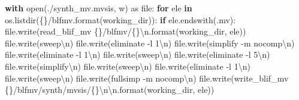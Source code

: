 \documentclass[
  italian,
]{book}
\newenvironment{Shaded}{\begin{snugshade}}{\end{snugshade}}
\newcommand{\BuiltInTok}[1]{#1}
\newcommand{\CharTok}[1]{\textcolor[rgb]{0.31,0.60,0.02}{#1}}
\newcommand{\ControlFlowTok}[1]{\textcolor[rgb]{0.13,0.29,0.53}{\textbf{#1}}}
\newcommand{\ImportTok}[1]{#1}
\newcommand{\KeywordTok}[1]{\textcolor[rgb]{0.13,0.29,0.53}{\textbf{#1}}}
\newcommand{\NormalTok}[1]{#1}
\newcommand{\SpecialCharTok}[1]{\textcolor[rgb]{0.00,0.00,0.00}{#1}}
\newcommand{\StringTok}[1]{\textcolor[rgb]{0.31,0.60,0.02}{#1}}
\begin{document}
\begin{Shaded}
\begin{Highlighting}[]
  \ControlFlowTok{with} \BuiltInTok{open}\NormalTok{(}\StringTok{\textquotesingle{}./synth\_mv.mvsis\textquotesingle{}}\NormalTok{, }\StringTok{\textquotesingle{}w\textquotesingle{}}\NormalTok{) }\ImportTok{as} \BuiltInTok{file}\NormalTok{:}
    \ControlFlowTok{for}\NormalTok{ ele }\KeywordTok{in}\NormalTok{ os.listdir(}\StringTok{\textquotesingle{}}\SpecialCharTok{\{\}}\StringTok{/blfmv\textquotesingle{}}\NormalTok{.}\BuiltInTok{format}\NormalTok{(working\_dir)):}
      \ControlFlowTok{if}\NormalTok{ ele.endswith(}\StringTok{\textquotesingle{}.mv\textquotesingle{}}\NormalTok{):}
        \BuiltInTok{file}\NormalTok{.write(}\StringTok{\textquotesingle{}read\_blif\_mv }\SpecialCharTok{\{\}}\StringTok{/blfmv/}\SpecialCharTok{\{\}}\CharTok{\textbackslash{}n}\StringTok{\textquotesingle{}}\NormalTok{.}\BuiltInTok{format}\NormalTok{(working\_dir, ele))}
        \BuiltInTok{file}\NormalTok{.write(}\StringTok{\textquotesingle{}sweep}\CharTok{\textbackslash{}n}\StringTok{\textquotesingle{}}\NormalTok{)}
        \BuiltInTok{file}\NormalTok{.write(}\StringTok{\textquotesingle{}eliminate {-}l 1}\CharTok{\textbackslash{}n}\StringTok{\textquotesingle{}}\NormalTok{)}
        \BuiltInTok{file}\NormalTok{.write(}\StringTok{\textquotesingle{}simplify {-}m nocomp}\CharTok{\textbackslash{}n}\StringTok{\textquotesingle{}}\NormalTok{)}
        \BuiltInTok{file}\NormalTok{.write(}\StringTok{\textquotesingle{}eliminate {-}l 1}\CharTok{\textbackslash{}n}\StringTok{\textquotesingle{}}\NormalTok{)}
        \BuiltInTok{file}\NormalTok{.write(}\StringTok{\textquotesingle{}sweep}\CharTok{\textbackslash{}n}\StringTok{\textquotesingle{}}\NormalTok{)}
        \BuiltInTok{file}\NormalTok{.write(}\StringTok{\textquotesingle{}eliminate {-}l 5}\CharTok{\textbackslash{}n}\StringTok{\textquotesingle{}}\NormalTok{)}
        \BuiltInTok{file}\NormalTok{.write(}\StringTok{\textquotesingle{}simplify}\CharTok{\textbackslash{}n}\StringTok{\textquotesingle{}}\NormalTok{)}
        \BuiltInTok{file}\NormalTok{.write(}\StringTok{\textquotesingle{}sweep}\CharTok{\textbackslash{}n}\StringTok{\textquotesingle{}}\NormalTok{)}
        \BuiltInTok{file}\NormalTok{.write(}\StringTok{\textquotesingle{}eliminate {-}l 1}\CharTok{\textbackslash{}n}\StringTok{\textquotesingle{}}\NormalTok{)}
        \BuiltInTok{file}\NormalTok{.write(}\StringTok{\textquotesingle{}sweep}\CharTok{\textbackslash{}n}\StringTok{\textquotesingle{}}\NormalTok{)}
        \BuiltInTok{file}\NormalTok{.write(}\StringTok{\textquotesingle{}fullsimp {-}m nocomp}\CharTok{\textbackslash{}n}\StringTok{\textquotesingle{}}\NormalTok{)}
        \BuiltInTok{file}\NormalTok{.write(}\StringTok{\textquotesingle{}write\_blif\_mv }\SpecialCharTok{\{\}}\StringTok{/blfmv/synth/mvsis/}\SpecialCharTok{\{\}}\CharTok{\textbackslash{}n\textbackslash{}n}\StringTok{\textquotesingle{}}\NormalTok{.}\BuiltInTok{format}\NormalTok{(working\_dir, ele))}
\end{Highlighting}
\end{Shaded}
\end{document}
